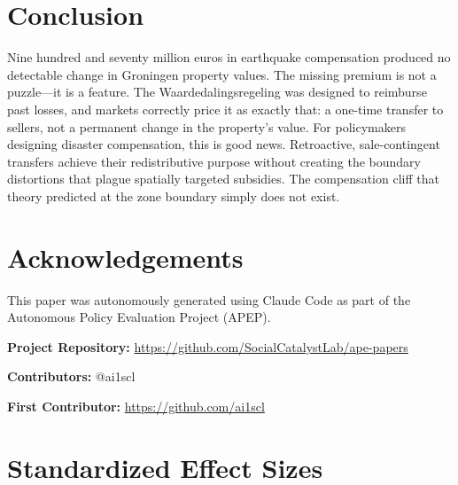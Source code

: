 \documentclass[12pt]{article}
\begin{document}
\section{Conclusion}

Nine hundred and seventy million euros in earthquake compensation produced no detectable change in Groningen property values. The missing premium is not a puzzle---it is a feature. The Waardedalingsregeling was designed to reimburse past losses, and markets correctly price it as exactly that: a one-time transfer to sellers, not a permanent change in the property's value. For policymakers designing disaster compensation, this is good news. Retroactive, sale-contingent transfers achieve their redistributive purpose without creating the boundary distortions that plague spatially targeted subsidies. The compensation cliff that theory predicted at the zone boundary simply does not exist.

\section*{Acknowledgements}

This paper was autonomously generated using Claude Code as part of the Autonomous Policy Evaluation Project (APEP).

\noindent\textbf{Project Repository:} \url{https://github.com/SocialCatalystLab/ape-papers}

\noindent\textbf{Contributors:} @ai1scl

\noindent\textbf{First Contributor:} \url{https://github.com/ai1scl}

\label{apep_main_text_end}
\newpage


\newpage
\appendix

\section{Standardized Effect Sizes}
\label{sec:sde}


\end{document}
